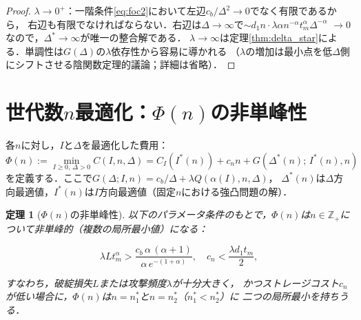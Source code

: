 \documentclass[12pt,a4paper]{article}
\theoremstyle{plain}
\newtheorem{theorem}{定理}[section]
\theoremstyle{definition}
\theoremstyle{remark}
\newcommand{\Z}{\mathbb{Z}}
\newcommand{\Dopt}{\Delta^*}
\begin{document}
\begin{proof}
$\lambda\to0^+$：一階条件\eqref{eq:foc2}において左辺$c_b/\Delta^2\to0$でなく有限であるから，
右辺も有限でなければならない．右辺は$\Delta\to\infty$で$\sim d_1 n\cdot\lambda\alpha n^{-\alpha}t_m^\alpha\Delta^{-\alpha}$
$\to0$なので，$\Dopt\to\infty$が唯一の整合解である．
$\lambda\to\infty$は定理\ref{thm:delta_star}による．単調性は$G(\Delta)$の$\lambda$依存性から容易に導かれる
（$\lambda$の増加は最小点を低$\Delta$側にシフトさせる陰関数定理的議論；詳細は省略）．
\end{proof}

\section{世代数$n$最適化：$\Phi(n)$の非単峰性}
\label{sec:nonunimodal}

各$n$に対し，$I$と$\Delta$を最適化した費用：
\[
  \Phi(n) := \min_{I\ge0,\,\Delta>0} C(I,n,\Delta)
  = C_I(I^*(n)) + c_n n + G(\Dopt(n);\,I^*(n),n)
\]
を定義する．ここで$G(\Delta;I,n)=c_b/\Delta+\lambda Q(\alpha(I),n,\Delta)$，
$\Dopt(n)$は$\Delta$方向最適値，$I^*(n)$は$I$方向最適値（固定$n$における強凸問題の解）．

\begin{theorem}[$\Phi(n)$の非単峰性]\label{thm:non_unimodal}
以下のパラメータ条件のもとで，$\Phi(n)$は$n\in\Z_+$について非単峰的（複数の局所最小値）になる：

\[
  \lambda L t_m^\alpha > \frac{c_b\,\alpha\,(\alpha+1)}{\alpha\, e^{-(1+\alpha)}},
  \quad c_n < \frac{\lambda d_1 t_m}{2},
\]

すなわち，破綻損失$L$または攻撃頻度$\lambda$が十分大きく，
かつストレージコスト$c_n$が低い場合に，$\Phi(n)$は$n=n_1^*$と$n=n_2^*$（$n_1^*<n_2^*$）に
二つの局所最小を持ちうる．
\end{theorem}
\end{document}
